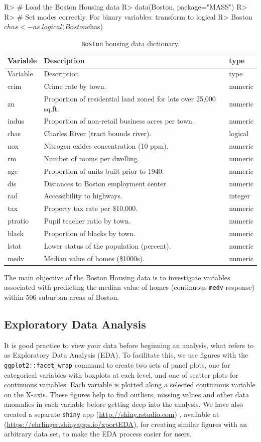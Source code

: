 \documentclass[article]{jss}
\begin{document}
\begin{CodeChunk}

\begin{CodeInput}
R> # Load the Boston Housing data
R> data(Boston, package="MASS")
R> 
R> # Set modes correctly. For binary variables: transform to logical
R> Boston$chas <- as.logical(Boston$chas)
\end{CodeInput}
\end{CodeChunk}

\begin{longtable}[]{@{}lll@{}}
\caption{\texttt{Boston} housing data dictionary.}\tabularnewline
\toprule
Variable & Description & type\tabularnewline
\midrule
\endfirsthead
\toprule
Variable & Description & type\tabularnewline
\midrule
\endhead
crim & Crime rate by town. & numeric\tabularnewline
zn & Proportion of residential land zoned for lots over 25,000 sq.ft. &
numeric\tabularnewline
indus & Proportion of non-retail business acres per town. &
numeric\tabularnewline
chas & Charles River (tract bounds river). & logical\tabularnewline
nox & Nitrogen oxides concentration (10 ppm). & numeric\tabularnewline
rm & Number of rooms per dwelling. & numeric\tabularnewline
age & Proportion of units built prior to 1940. & numeric\tabularnewline
dis & Distances to Boston employment center. & numeric\tabularnewline
rad & Accessibility to highways. & integer\tabularnewline
tax & Property tax rate per \$10,000. & numeric\tabularnewline
ptratio & Pupil teacher ratio by town. & numeric\tabularnewline
black & Proportion of blacks by town. & numeric\tabularnewline
lstat & Lower status of the population (percent). &
numeric\tabularnewline
medv & Median value of homes (\$1000s). & numeric\tabularnewline
\bottomrule
\end{longtable}

The main objective of the Boston Housing data is to investigate
variables associated with predicting the median value of homes
(continuous \texttt{medv} response) within 506 suburban areas of Boston.

\subsection{Exploratory Data Analysis}\label{exploratory-data-analysis}

It is good practice to view your data before beginning an analysis,
what\citep{Tukey:1977} refers to as Exploratory Data Analysis (EDA). To
facilitate this, we use  figures with the
\texttt{ggplot2::facet\_wrap} command to create two sets of panel plots,
one for categorical variables with boxplots at each level, and one of
scatter plots for continuous variables. Each variable is plotted along a
selected continuous variable on the X-axis. These figures help to find
outliers, missing values and other data anomalies in each variable
before getting deep into the analysis. We have also created a separate
\texttt{shiny} app (\url{http://shiny.rstudio.com}) \citep{shiny:2015},
available at (\url{https://ehrlinger.shinyapps.io/xportEDA}), for
creating similar figures with an arbitrary data set, to make the EDA
process easier for users.
\end{document}
